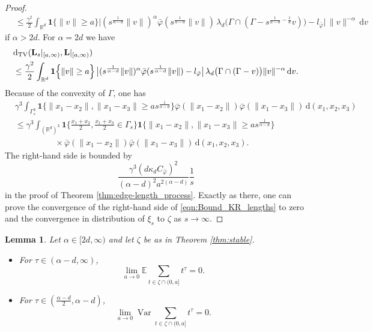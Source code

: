 \documentclass{article}
\newtheorem{lemma}[theorem]{Lemma}
\theoremstyle{definition}
\numberwithin{equation}{section}
\theoremstyle{remark}
\newcommand{\R}{\mathbb{R}}
\begin{document}
\begin{proof}
\begin{align*}
& \leq \frac{\gamma^2}{2}  \int_{\mathbb{R}^d} \mathbf{1}\Big\{\|v\|\geq a\Big\} \big| (s^{\frac{1}{\alpha-d}}\|v\|)^\alpha
\bar\varphi(s^{\frac{1}{\alpha-d}}\|v\|)\,
\lambda_d\big(\Gamma\cap(\Gamma-s^{\frac{1}{\alpha-d}-\frac{1}{d}}v)\big) - l_{\bar{\varphi}}\big| \, \|v\|^{-\alpha}\,\mathrm{d}v
\end{align*}
if $\alpha>2d$. For $\alpha=2d$ we have
\begin{align*}
& \mathrm{d}_{\rm TV}(\mathbf{L}_s|_{[a,\infty)},\mathbf{L}|_{[a,\infty)}) \\
& \leq \frac{\gamma^2}{2} \int_{\R^d}
\mathbf{1}\Big\{\|v\|\geq a\Big\}\, \big|(s^{\frac{1}{\alpha-d}}\|v\|)^\alpha
\bar\varphi(s^{\frac{1}{\alpha-d}}\|v\|) - l_{\bar{\varphi}}\big|\,
\lambda_d\big(\Gamma\cap(\Gamma-v)\big) \|v\|^{-\alpha}\,\mathrm{d}v.
\end{align*}
Because of the convexity of $\Gamma$, one has
\begin{align*}
& \gamma^3 \int_{\Gamma_s^3} \mathbf{1}\{ \|x_1-x_2\|, \|x_1-x_3\| \geq a s^{\frac{1}{\alpha-d}}\} \bar{\varphi}(\|x_1-x_2\|) \bar{\varphi}(\|x_1-x_3\|) \, \mathrm{d}(x_1,x_2,x_3) \\
& \leq \gamma^3 \int_{(\mathbb{R}^d)^3} \mathbf{1}\bigg\{ \frac{x_1+x_2}{2}, \frac{x_1+x_3}{2} \in \Gamma_s \bigg\} \mathbf{1}\{ \|x_1-x_2\|, \|x_1-x_3\| \geq a s^{\frac{1}{\alpha-d}}\} \\
& \hspace{2cm} \times \bar{\varphi}(\|x_1-x_2\|) \bar{\varphi}(\|x_1-x_3\|) \, \mathrm{d}(x_1,x_2,x_3).
\end{align*}
The right-hand side is bounded by
$$
\frac{\gamma^3 (d\kappa_d C_{\bar{\varphi}})^2}{(\alpha-d)^2 a^{2(\alpha-d)}} \frac{1}{s}
$$
in the proof of Theorem \ref{thm:edge-length_process}. Exactly as there, one can prove the convergence of the right-hand side of \eqref{eqn:Bound_KR_lengths} to zero and the convergence in distribution of $\xi_s$ to $\zeta$ as $s\to\infty$.
\end{proof}

\iffalse
\begin{lemma}
Let $\alpha\in[2d,\infty)$ and let $\zeta$ be as in Theorem \ref{thm:stable}.
\begin{itemize}
\item [a)] For $\tau\in(\alpha-d,\infty)$,
$$
\lim_{a\to0} \mathbb{E}\sum_{t\in\zeta\cap(0,a]} t^\tau =0.
$$
\item [b)] For $\tau\in(\frac{\alpha-d}{2},\alpha-d)$,
$$
\lim_{a\to 0}\operatorname{Var} \sum_{t\in\zeta\cap(0,a]} t^\tau =0.
$$
\end{itemize}
\end{lemma}
\end{document}
